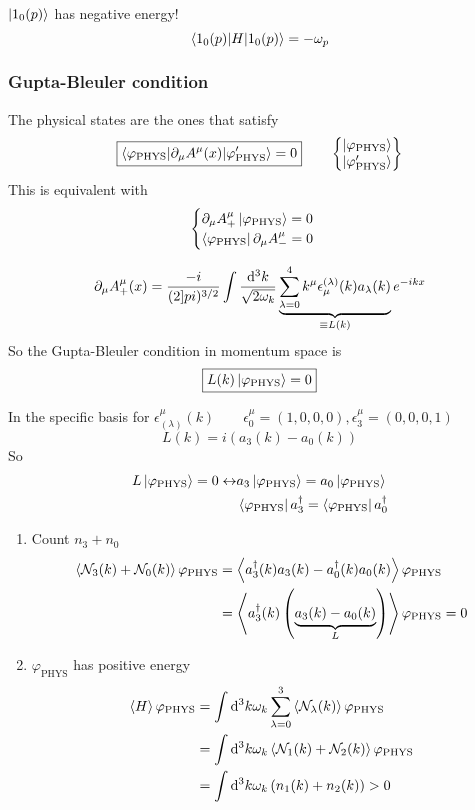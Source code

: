 \begin{example}
$\left| 1_0(p) \right\rangle$ has negative energy!
\[ \braket[H]{1_0(p)}{1_0(p)} = -\omega_p \]
\end{example}

\subsubsection{Gupta-Bleuler condition}
The physical states are the ones that satisfy
\[ \boxed{\braket[\partial_\mu A^\mu(x)]{\varphi_\text{PHYS}}{\varphi_\text{PHYS}'} = 0} \qquad \begin{Bmatrix} \ket{\varphi_\text{PHYS}} \\ \ket{\varphi'_\text{PHYS}} \end{Bmatrix} \]
This is equivalent with
\[ \begin{cases}
\partial_\mu A^\mu_+\left| \varphi_\text{PHYS} \right\rangle = 0 \\
\left\langle \varphi_\text{PHYS} \right|\partial_\mu A^\mu_- = 0
\end{cases} \]

\[ \partial_\mu A^\mu_+(x) = \frac{-i}{(2]pi)^{3/2}}\int \frac{\operatorname{d \!}{^3k}}{\sqrt{2\omega_k}}\underbrace{\sum^4_{\lambda=0}k^\mu\epsilon_\mu^{(\lambda)}(k)a_\lambda(k)}_{\equiv L(k)}e^{-ikx} \]
So the Gupta-Bleuler condition in momentum space is
\[ \boxed{L(k)\left| \varphi_\text{PHYS} \right\rangle = 0} \]

In the specific basis for $\epsilon^\mu_{(\lambda)}(k) \qquad \epsilon^\mu_0 = (1,0,0,0), \epsilon^\mu_3 = (0,0,0,1)$
\[ L(k) = i \left(a_3(k)-a_0(k)\right) \]
So
\begin{align*}
L\left| \varphi_\text{PHYS} \right\rangle = 0 \leftrightarrow &a_3\left| \varphi_\text{PHYS} \right\rangle = a_0\left| \varphi_\text{PHYS} \right\rangle \\
&\left\langle \varphi_\text{PHYS} \right|a_3^\dagger = \left\langle \varphi_\text{PHYS} \right|a_0^\dagger
\end{align*}
\begin{enumerate}
\item Count $n_3+n_0$
\begin{align*}
\left\langle \mathcal{N}_3(k) + \mathcal{N}_0(k) \right\rangle{\varphi_\text{PHYS}} &= \left\langle a_3^\dagger(k)a_3(k) - a^\dagger_0(k)a_0(k) \right\rangle{\varphi_\text{PHYS}} \\
&= \left\langle a_3^\dagger(k)\left(\underbrace{a_3(k)-a_0(k)}_{L}\right) \right\rangle{\varphi_\text{PHYS}} = 0
\end{align*}
\item $\varphi_\text{PHYS}$ has positive energy
\begin{align*}
\left\langle H \right\rangle{\varphi_\text{PHYS}} &= \int \operatorname{d \!}{^3k}\omega_k\sum^3_{\lambda=0}\left\langle \mathcal{N}_\lambda(k) \right\rangle{\varphi_{\text{PHYS}}} \\
&= \int \operatorname{d \!}{^3k}\omega_k \left\langle \mathcal{N}_1(k) + \mathcal{N}_2(k) \right\rangle{\varphi_{\text{PHYS}}} \\
&= \int \operatorname{d \!}{^3k} \omega_k \left(n_1(k) + n_2(k)\right) > 0
\end{align*}
\end{enumerate}

